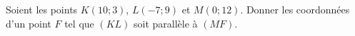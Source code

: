 
\begin{exercice}\label{exosmath-0706}

    Soient les points \( K(10;3)\), \( L(-7;9)\) et \( M(0;12)\). Donner les coordonnées d'un point \( F\) tel que \( (KL)\) soit parallèle à \( (MF)\).

\end{exercice}
